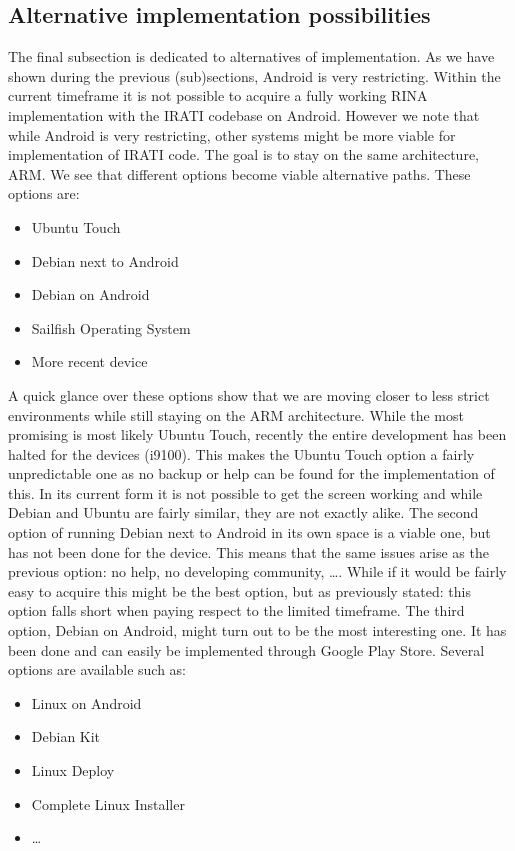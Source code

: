 \subsection{Alternative implementation possibilities}

The final subsection is dedicated to alternatives of implementation. As we have shown during the previous (sub)sections, Android is very restricting. Within the current timeframe it is not possible to acquire a fully working RINA implementation with the IRATI codebase on Android. However we note that while Android is very restricting, other systems might be more viable for implementation of IRATI code. The goal is to stay on the same architecture, ARM. We see that different options become viable alternative paths. These options are:

\begin{itemize}
	\item Ubuntu Touch
	\item Debian next to Android
	\item Debian on Android
	\item Sailfish Operating System 
	\item More recent device
\end{itemize}

\npar

A quick glance over these options show that we are moving closer to less strict environments while still staying on the ARM architecture. While the most promising is most likely Ubuntu Touch, recently the entire development has been halted for the devices (i9100). This makes the Ubuntu Touch option a fairly unpredictable one as no backup or help can be found for the implementation of this. In its current form it is not possible to get the screen working and while Debian and Ubuntu are fairly similar, they are not exactly alike.
\npar
The second option of running Debian next to Android in its own space is a viable one, but has not been done for the device. This means that the same issues arise as the previous option: no help, no developing community, \ldots. While if it would be fairly easy to acquire this might be the best option, but as previously stated: this option falls short when paying respect to the limited timeframe. 
\npar
The third option, Debian on Android, might turn out to be the most interesting one. It has been done and can easily be implemented through Google Play Store. Several options are available such as:

\begin{itemize}
	\item Linux on Android
	\item Debian Kit
	\item Linux Deploy
	\item Complete Linux Installer
	\item \ldots
\end{itemize}

